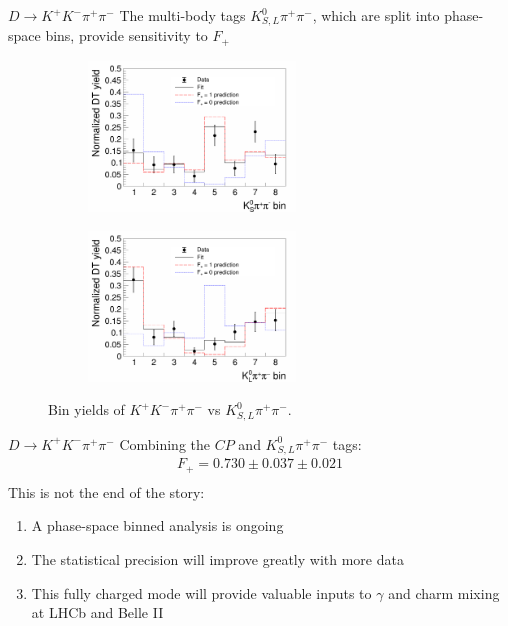 \documentclass{beamer}
\begin{document}
\begin{frame}{$D\to K^+K^-\pi^+\pi^-$}
  \vspace{0.0cm}
  {\large The multi-body tags $K_{S, L}^0\pi^+\pi^-$, which are split into phase-space bins, provide sensitivity to $F_+$}
  \begin{figure}
    \centering
    \begin{subfigure}{0.5\textwidth}
      \centering
      \includegraphics[height=4.0cm]{Figures/CPeven_fraction_combination_KSpipi.png}
    \end{subfigure}%
    \begin{subfigure}{0.5\textwidth}
      \centering
      \includegraphics[height=4.0cm]{Figures/CPeven_fraction_combination_KLpipi.png}
    \end{subfigure}
    \caption*{Bin yields of $K^+K^-\pi^+\pi^-$ vs $K_{S, L}^0\pi^+\pi^-$.}
  \end{figure}
\end{frame}

\begin{frame}{$D\to K^+K^-\pi^+\pi^-$}
  \vspace{0.0cm}
  {\large Combining the $C\!P$ and $K_{S, L}^0\pi^+\pi^-$ tags:}
  \begin{align*}
    F_+ = 0.730 \pm 0.037 \pm 0.021 \\
  \end{align*}
  {\large This is not the end of the story:}
  \begin{enumerate}
    \setlength{\itemsep}{1.0em}
    \item{A phase-space binned analysis is ongoing}
    \item{The statistical precision will improve greatly with more data}
    \item{This fully charged mode will provide valuable inputs to $\gamma$ and charm mixing at LHCb and Belle II}
  \end{enumerate}
\end{frame}
\end{document}
